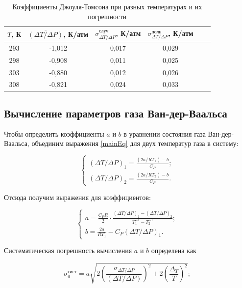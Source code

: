 \documentclass[a4paper,12pt]{article} %
\begin{document}
\begin{table}[]
    \centering
    \begin{tabular}{|c|c|c|c|c|c|}\hline
        $T$, К & $\overline{(\Delta T/\Delta P)}$, К/атм & $\sigma^\text{случ}_{\Delta T/\Delta P}$, К/атм & $\sigma^\text{полн}_{\Delta T/\Delta P}$, К/атм \\ \hline
        293 & -1,012 & 0,017 & 0,029 \\ \hline
        298 & -0,908 & 0,011 & 0,025 \\ \hline
        303 & -0,880 & 0,012 & 0,026 \\ \hline
        308 & -0,821 & 0,024 & 0,033 \\ \hline
        \end{tabular}
    \caption{Коэффициенты Джоуля-Томсона при разных температурах и их погрешности}
    \label{tab:medKoeffs}
\end{table}

\subsection{Вычисление параметров газа Ван-дер-Ваальса}

Чтобы определить коэффициенты $a$ и $b$ в уравнении состояния газа Ван-дер-Ваальса, объединим выражения \eqref{mainEq} для двух температур газа в систему:

\begin{equation*}
 \begin{cases}
   (\Delta T/\Delta P)_1 = \frac{(2a/RT_1) - b}{C_P}; \\
   (\Delta T/\Delta P)_2 = \frac{(2a/RT_2) - b}{C_P}.
 \end{cases}
\end{equation*}

Отсюда получим выражения для коэффициентов:

\begin{equation*}
 \begin{cases}
   a = \frac{C_P R}{2} \cdot \frac{(\Delta T/\Delta P)_1 - (\Delta T/\Delta P)_2}{T_1^{-1} - T_2^{-1}}; \\
   b = \frac{2a}{RT_1} - C_P (\Delta T/\Delta P)_1.
 \end{cases}
\end{equation*}

Систематическая погрешность вычисления $a$ и $b$ определена как

\begin{equation}
    \sigma_a^\text{сист} = a\sqrt{2(\frac{\sigma_{\Delta T/\Delta P}}{(\Delta T/\Delta P)})^2 + 2(\frac{\Delta_T}{T})^2};
\end{equation}
\end{document}
